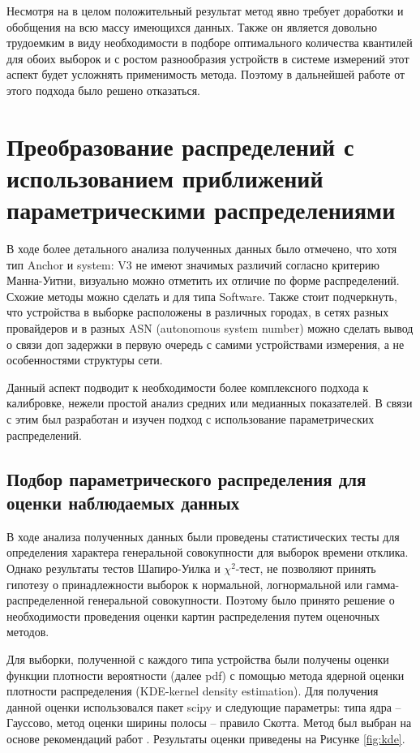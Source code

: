 Несмотря на в целом положительный результат метод явно требует доработки и обобщения на всю массу имеющихся данных. Также он является довольно трудоемким в виду необходимости в подборе оптимального количества квантилей для обоих выборок и с ростом разнообразия устройств в системе измерений этот аспект будет усложнять применимость метода. Поэтому в дальнейшей работе от этого подхода было решено отказаться.


\section{Преобразование распределений с использованием приближений параметрическими распределениями}\label{subsec:ch3/sect5}

В ходе более детального анализа полученных данных было отмечено, что хотя тип Anchor и system: V3 не имеют значимых различий согласно критерию Манна-Уитни, визуально можно отметить их отличие по форме распределений. Схожие методы можно сделать и для типа Software. Также стоит подчеркнуть, что устройства в выборке расположены в различных городах, в сетях разных провайдеров и в разных ASN (autonomous system number) можно сделать вывод о связи доп задержки в первую очередь с самими устройствами измерения, а не особенностями структуры сети.
	

Данный аспект подводит к необходимости более комплексного подхода к калибровке, нежели простой анализ средних или медианных показателей. В связи с этим был разработан и изучен подход с использование параметрических распределений. 


\subsection{Подбор параметрического распределения для оценки наблюдаемых данных}\label{subsec:ch3/sect5/sub1}

В ходе анализа полученных данных были проведены статистических тесты для определения характера генеральной совокупности для выборок времени отклика. Однако результаты тестов Шапиро-Уилка и $\chi^2$-тест, не позволяют принять гипотезу о принадлежности выборок к нормальной, логнормальной или гамма-распределенной генеральной совокупности. Поэтому было принято решение о необходимости проведения оценки картин распределения путем оценочных методов. 

Для выборки, полученной с каждого типа устройства были получены оценки функции плотности вероятности (далее pdf) с помощью метода ядерной оценки плотности распределения (KDE-kernel density estimation). Для получения данной оценки использовался пакет scipy и следующие параметры: типа ядра – Гауссово, метод оценки ширины полосы – правило Скотта. Метод был выбран на основе рекомендаций работ \cite{Holterbach2015, ripe_miss, ripe2}. Результаты оценки приведены на Рисунке \ref{fig:kde}.

